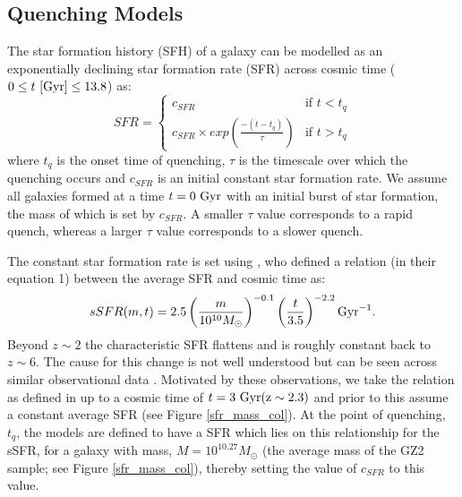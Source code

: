 \documentclass{mn2e}
\begin{document}
\subsection{Quenching Models}
The star formation history (SFH) of a galaxy can be modelled as an exponentially declining star formation rate (SFR) across cosmic time ($0 \leq t ~\rm{[Gyr]} \leq 13.8$) as:
\begin{equation}
SFR = 
\begin{cases}
c_{SFR} & \text{if } t < t_q \\
c_{SFR} \times exp{\left( \frac{-(t-t_{q})}{\tau}\right)} & \text{if } t > t_q 
\end{cases}
\end{equation}
where $t_{q}$ is the onset time of quenching, $\tau$ is the timescale over which the quenching occurs and $c_{SFR}$ is an initial constant star formation rate. We assume all galaxies formed at a time $t=0~\rm{Gyr}$ with an initial burst of star formation, the mass of which is set by $c_{SFR}$. A smaller $\tau$ value corresponds to a rapid quench, whereas a larger $\tau$ value corresponds to a slower quench.  

The constant star formation rate is set using \citet{Peng}, who defined a relation (in their equation 1) between the average SFR and cosmic time as:
\begin{equation}
sSFR(m,t) = 2.5 \left( \frac{m}{10^{10} M_{\odot}} \right)^{-0.1} \left(\frac{t}{3.5}\right)^{-2.2} \rm{Gyr}^{-1}.
\end{equation}
Beyond $z \sim 2$ the characteristic SFR flattens and is roughly constant back to $z\sim6$. The cause for this change is not well understood but can be seen across similar observational data \citep{Peng, Gonzalez, Beth}. Motivated by these observations, we take the relation as defined in \citet{Peng} up to a cosmic time of $t=3~\rm{Gyr} (z \sim 2.3)$ and prior to this assume a constant average SFR (see Figure \ref{sfr_mass_col}). At the point of quenching, $t_{q}$, the models are defined to have a SFR which lies on this relationship for the sSFR, for a galaxy with mass, $M = 10^{10.27} M_{\odot}$ (the average mass of the GZ2 sample; see Figure \ref{sfr_mass_col}), thereby setting the value of $c_{SFR}$ to this value.
 
\end{document}
